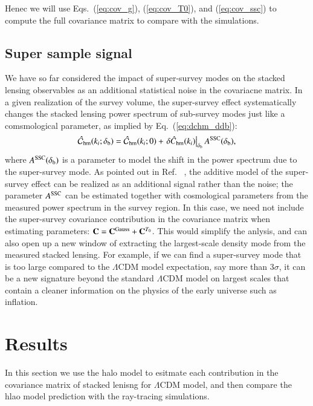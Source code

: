 \documentclass[onecolumn,notitlepage,showpacs,amsmath,amssymb,prd,floatfix]{revtex4-1}
\newcommand{\deltab}{\delta_{\rm b}}
\newcommand{\hchm}{\hat{C}_{\mathrm{hm}}}
\begin{document}
Henec we will use Eqs.~(\ref{eq:cov_g}), (\ref{eq:cov_T0}), and
(\ref{eq:cov_ssc}) to compute the full covariance matrix to compare with
the simulations. 

\subsection{Super sample signal}

We have so far considered the impact of super-survey modes on the
stacked lensing observables as an additional statistical noise in the
covariacne matrix. In a given realization of the survey volume, the
super-survey effect systematically changes the stacked lensing power
spectrum of sub-survey modes just like a comsmological parameter, as
implied by Eq.~(\ref{eq:dchm_ddb}):
%
\begin{equation}
 \hat{{\cal C}}_{\rm hm}(k_i;\deltab)=\hat{{\cal C}}_{\rm
  hm}(k_i;0)+\left.\delta \hchm(k_i)\right|_{\deltab}A^{\rm
  SSC}(\deltab),
\end{equation}
%
where $A^{\rm SSC}(\deltab)$ is a parameter to model the shift in the
power spectrum due to the super-survey mode.  As pointed out in
Ref.~\cite{Lietal:14b} \cite[see also][]{MohammedSeljak:14}, the
additive model of the super-survey effect can be realized as an
additional signal rather than the noise; the parameter $A^{\rm SSC}$ can
be estimated together with cosmological parameters from the measured
power spectrum in the survey region. In this case, we need not include
the super-survey covariance contribution in the covariance matrix when
estimating parameters: ${\bf C}={\bf C}^{\rm Gauss}+{\bf C}^{T_0}$. This
would simplify the anlysis, and can also open up a new window of
extracting the largest-scale density mode from the measured stacked
lensing. For example, if we can find a super-survey mode that is too
large compared to the $\Lambda$CDM model expectation, say more than
3$\sigma$, it can be a new signature beyond the standard $\Lambda$CDM
model on largest scales that contain a cleaner information on the
physics of the early universe such as inflation.


\section{Results}

In this section we use the halo model to esitmate each contribution in
the covariance matrix of stacked lenisng for $\Lambda$CDM model, and
then compare the hlao model prediction with the ray-tracing simulations.
\end{document}
